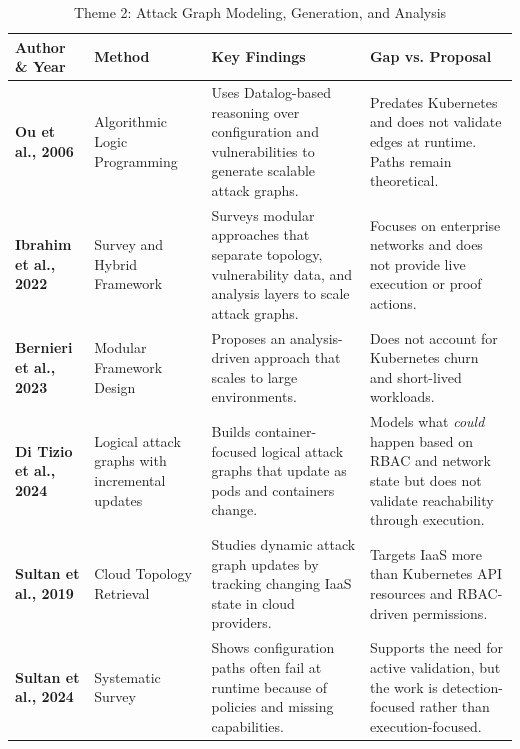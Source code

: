 \documentclass[conference]{IEEEtran}
\begin{document}
\begin{table}[t!]
\centering
\caption{Theme 2: Attack Graph Modeling, Generation, and Analysis}
\label{tab:litmatrix-theme2}
\scriptsize
\setlength{\tabcolsep}{5pt}
\renewcommand{\arraystretch}{1.3}
\begin{tabularx}{\textwidth}{l p{2.6cm} X X}
\toprule
\textbf{Author \& Year} & \textbf{Method} & \textbf{Key Findings} & \textbf{Gap vs. Proposal} \\
\midrule
\textbf{Ou et al., 2006} \cite{ou2006scalable} & Algorithmic Logic Programming & Uses Datalog-based reasoning over configuration and vulnerabilities to generate scalable attack graphs. & Predates Kubernetes and does not validate edges at runtime. Paths remain theoretical. \\
\addlinespace
\textbf{Ibrahim et al., 2022} \cite{ibrahim2022strategies} & Survey and Hybrid Framework & Surveys modular approaches that separate topology, vulnerability data, and analysis layers to scale attack graphs. & Focuses on enterprise networks and does not provide live execution or proof actions. \\
\addlinespace
\textbf{Bernieri et al., 2023} \cite{bernieri2023scalable} & Modular Framework Design & Proposes an analysis-driven approach that scales to large environments. & Does not account for Kubernetes churn and short-lived workloads. \\
\addlinespace
\textbf{Di Tizio et al., 2024} \cite{ditizio2024coral} & Logical attack graphs with incremental updates & Builds container-focused logical attack graphs that update as pods and containers change. & Models what \emph{could} happen based on RBAC and network state but does not validate reachability through execution. \\
\addlinespace
\textbf{Sultan et al., 2019} \cite{sultan2019generation} & Cloud Topology Retrieval & Studies dynamic attack graph updates by tracking changing IaaS state in cloud providers. & Targets IaaS more than Kubernetes API resources and RBAC-driven permissions. \\
\addlinespace
\textbf{Sultan et al., 2024} \cite{sultan2024detecting} & Systematic Survey & Shows configuration paths often fail at runtime because of policies and missing capabilities. & Supports the need for active validation, but the work is detection-focused rather than execution-focused. \\
\bottomrule
\end{tabularx}
\end{table}
\end{document}

